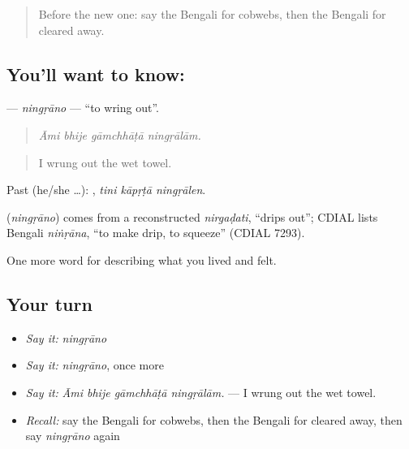 \begin{quote}
Before the new one: say the Bengali for cobwebs, then the Bengali for cleared away.
\end{quote}

\subsection*{You'll want to know: }
\textbf{} — \emph{ningṛāno} — \textquotedblleft{}to wring out\textquotedblright{}.

\begin{quote}
   
\end{quote}

\begin{quote}
\emph{Āmi bhije gāmchhāṭā ningṛālām.}
\end{quote}

\begin{quote}
I wrung out the wet towel.
\end{quote}

Past (he/she …):   , \emph{tini kāpṛṭā ningṛālen}.

\begin{cousinweb}
\textbf{} (\emph{ningṛāno}) comes from a reconstructed \emph{nirgaḍati}, \textquotedblleft{}drips out\textquotedblright{}; CDIAL lists Bengali \emph{niṅṛāna}, \textquotedblleft{}to make drip, to squeeze\textquotedblright{} (CDIAL 7293).
\end{cousinweb}

\begin{grammarlens}[title={What you've built}]
One more word for describing what you lived and felt.
\end{grammarlens}

\subsection*{Your turn}
\begin{itemize}
\raggedright
  \item \emph{Say it:} \emph{ningṛāno}
  \item \emph{Say it:} \emph{ningṛāno}, once more
  \item \emph{Say it:} \emph{Āmi bhije gāmchhāṭā ningṛālām.} — I wrung out the wet towel.
  \item \emph{Recall:} say the Bengali for cobwebs, then the Bengali for cleared away, then say \emph{ningṛāno} again
\end{itemize}

